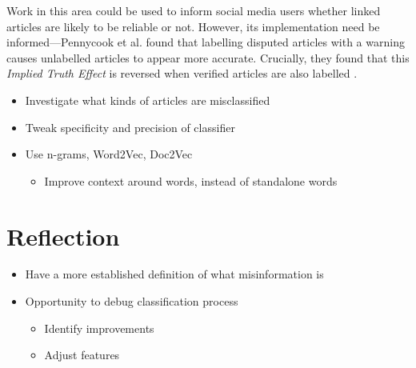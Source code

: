 \documentclass[12pt]{article}
\begin{document}
	Work in this area could be used to inform social media users whether linked articles are likely to be reliable or not. However, its implementation need be informed---Pennycook et al. found that labelling disputed articles with a warning causes unlabelled articles to appear more accurate. Crucially, they found that this \textit{Implied Truth Effect} is reversed when verified articles are also labelled \cite{pennycook}.

	\begin{itemize}
		\item Investigate what kinds of articles are misclassified
		\item Tweak specificity and precision of classifier
		\item Use n-grams, Word2Vec, Doc2Vec
		\begin{itemize}
			\item Improve context around words, instead of standalone words
		\end{itemize}
	\end{itemize}

	\section{Reflection}

	\begin{itemize}
		\item Have a more established definition of what misinformation is
		\item Opportunity to debug classification process
		\begin{itemize}
			\item Identify improvements
			\item Adjust features
		\end{itemize}
	\end{itemize}

	
	
\end{document}

